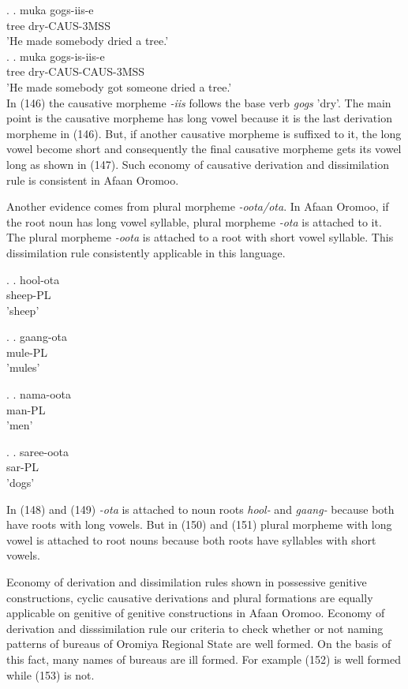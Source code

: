 \documentclass[11pt,a4paper]{article}
\begin{document}
	\ex.
	\ag.
	muka gogs-iis-e\\
	tree dry-CAUS-3MSS\\
	'He made somebody dried a tree.'\\
	
	\ex.
	\ag.
	muka gogs-is-iis-e\\
	tree dry-CAUS-CAUS-3MSS\\
	'He made somebody got someone dried a tree.'\\
	
	In (146) the causative morpheme \emph{-iis} follows the base verb \emph{gogs} 'dry'. The main point is the causative morpheme has long vowel because it is the last derivation morpheme in (146). But, if another causative morpheme is suffixed to it, the long vowel become short and consequently the final causative morpheme gets its vowel long as shown in (147). Such economy of causative derivation and dissimilation rule is consistent in Afaan Oromoo. 
	
	Another evidence comes from plural morpheme \emph{-oota/ota}. In Afaan Oromoo, if the root noun has long vowel syllable, plural morpheme \emph{-ota} is attached to it. The plural morpheme \emph{-oota} is attached to a root with short vowel syllable. This dissimilation rule consistently applicable in this language.
	
	\ex.
	\ag.
	hool-ota\\
	sheep-PL\\
	'sheep'
	
	\ex.
	\ag.
	gaang-ota\\
	mule-PL\\
	'mules'
	
	\ex.
	\ag.
	nama-oota\\
	man-PL\\
	'men'
	
	\ex.
	\ag.
	saree-oota\\
	sar-PL\\
	'dogs'
	
	In (148) and (149) \emph{-ota} is attached to noun roots \emph{hool-} and \emph{gaang-} because both have roots with long vowels. But in (150) and (151) plural morpheme with long vowel is attached to root nouns because both roots have syllables with short vowels. 
	
	Economy of derivation and dissimilation rules shown in possessive genitive constructions, cyclic causative derivations and plural formations are equally applicable on genitive of genitive constructions in Afaan Oromoo. Economy of derivation and disssimilation rule our criteria to check whether or not naming patterns of bureaus of Oromiya Regional State are well formed. On the basis of this fact, many names of bureaus are ill formed. For example (152) is well formed while (153) is not.
	
\end{document}
